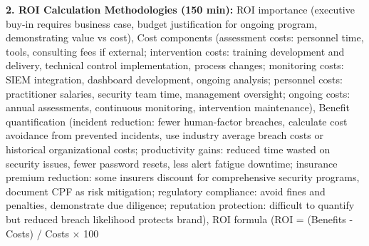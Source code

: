 \documentclass[11pt,a4paper]{article}
\begin{document}
\textbf{2. ROI Calculation Methodologies (150 min):} ROI importance (executive buy-in requires business case, budget justification for ongoing program, demonstrating value vs cost), Cost components (assessment costs: personnel time, tools, consulting fees if external; intervention costs: training development and delivery, technical control implementation, process changes; monitoring costs: SIEM integration, dashboard development, ongoing analysis; personnel costs: practitioner salaries, security team time, management oversight; ongoing costs: annual assessments, continuous monitoring, intervention maintenance), Benefit quantification (incident reduction: fewer human-factor breaches, calculate cost avoidance from prevented incidents, use industry average breach costs or historical organizational costs; productivity gains: reduced time wasted on security issues, fewer password resets, less alert fatigue downtime; insurance premium reduction: some insurers discount for comprehensive security programs, document CPF as risk mitigation; regulatory compliance: avoid fines and penalties, demonstrate due diligence; reputation protection: difficult to quantify but reduced breach likelihood protects brand), ROI formula (ROI = (Benefits - Costs) / Costs × 100%
\end{document}
